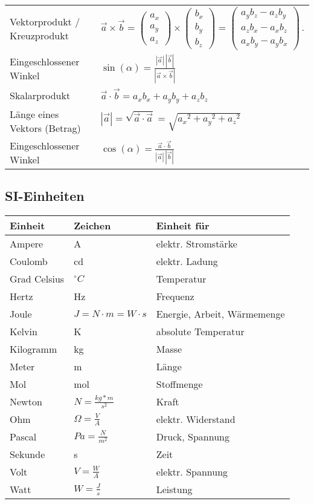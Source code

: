 \begin{tabbing}
	\begin{tabu} to \linewidth {l X}
		\toprule
		Vektorprodukt / Kreuzprodukt & $
		\vec{a}\times\vec{b}
		=
		\begin{pmatrix}a_x \\ a_y \\ a_z\end{pmatrix}
		\times
		\begin{pmatrix}b_x \\ b_y \\ b_z \end{pmatrix}
		=
		\begin{pmatrix}
		a_yb_z - a_zb_y \\
		a_zb_x - a_xb_z \\
		a_xb_y - a_yb_x
		\end{pmatrix}\,.
		$ \\
		Eingeschlossener Winkel & $\sin(\alpha) = \frac{|\vec{a}|\, |\vec{b}|}{|\vec{a}\times\vec{b}|}$\\
		Skalarprodukt & $\vec a \cdot \vec b = a_x b_x + a_y  b_y +  a_z  b_z$ \\
		Länge eines Vektors (Betrag) & $| \vec a | = \sqrt{\vec a\cdot \vec a} = \sqrt{{a_x}^2+{a_y}^2+{a_z}^2}$ \\
		Eingeschlossener Winkel & $\cos (\alpha) = \frac{\vec a\cdot\vec b}{|\vec a|\,|\vec b|}$ \\
		\bottomrule
	\end{tabu}
\end{tabbing}


\subsection{SI-Einheiten}
\begin{tabbing}
	\begin{tabu} to \linewidth {l l X}
		\toprule
		Einheit & Zeichen & Einheit für \\
		\midrule
		Ampere  & A & elektr. Stromstärke \\
		Coulomb & cd & elektr. Ladung \\
		Grad Celsius & $^\circ C$ & Temperatur \\
		Hertz & Hz & Frequenz \\
		Joule & $J = N \cdot m = W \cdot s$ & Energie, Arbeit, Wärmemenge \\
		Kelvin & K & absolute Temperatur \\
		Kilogramm & kg & Masse \\
		Meter & m & Länge \\
		Mol & mol & Stoffmenge \\
		Newton & $N = \frac{kg*m}{s^2}$ & Kraft \\
		Ohm & $\Omega = \frac{V}{A}$ & elektr. Widerstand \\
		Pascal & $Pa = \frac{N}{m^2}$ & Druck, Spannung \\
		Sekunde & s & Zeit\\
		Volt & $V = \frac{W}{A}$ & elektr. Spannung\\
		Watt & $W = \frac{J}{s}$ & Leistung \\
		\bottomrule
	 \end{tabu}
\end{tabbing}